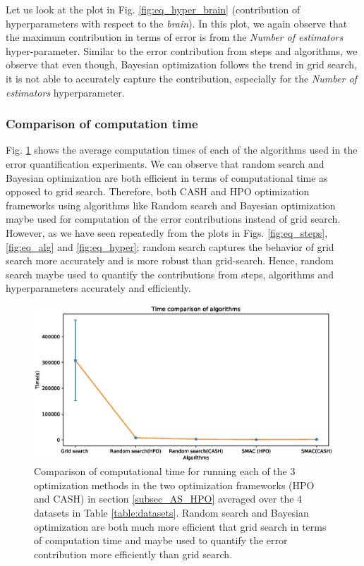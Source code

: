 Let us look at the plot in Fig. \ref{fig:eq_hyper_brain} (contribution of hyperparameters with respect to the \textit{brain}). In this plot, we again observe that the maximum contribution in terms of error is from the \textit{Number of estimators} hyper-parameter. Similar to the error contribution from steps and algorithms, we observe that even though, Bayesian optimization follows the trend in grid search, it is not able to accurately capture the contribution, especially for the \textit{Number of estimators} hyperparameter.


\subsubsection{Comparison of computation time}
Fig. \ref{fig:time} shows the average computation times of each of the algorithms used in the error quantification experiments. We can observe that random search and Bayesian optimization are both efficient in terms of computational time as opposed to grid search.
Therefore, both CASH and HPO optimization frameworks using algorithms like Random search and Bayesian optimization maybe used for computation of the error contributions instead of grid search. However, as we have seen repeatedly from the plots in Figs. \ref{fig:eq_steps}, \ref{fig:eq_alg} and \ref{fig:eq_hyper}; random search captures the behavior of grid search more accurately and is more robust than grid-search. Hence, random search maybe used to quantify the contributions from steps, algorithms and hyperparameters accurately and efficiently.

\begin{figure}[ht!]
    \centering
    \includegraphics[scale=0.4]{img/EP/times_algorithms.eps}
    \caption{Comparison of computational time for running each of the 3 optimization methods in the two optimization frameworks (HPO and CASH) in section \ref{subsec_AS_HPO} averaged over the 4 datasets in Table \ref{table:datasets}. Random search and Bayesian optimization are both much more efficient that grid search in terms of computation time and maybe used to quantify the error contribution more efficiently than grid search.}
    \label{fig:time}
\end{figure}


